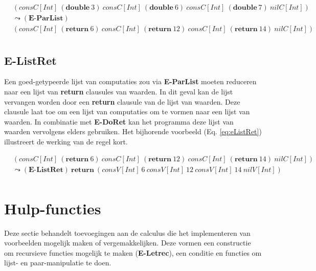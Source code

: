 \begin{equation}
\label{eq:eParList}
    \begin{split}
        & (consC[Int] \ (\textbf{double} \ 3) \ consC[Int] \ (\textbf{double} \ 6) \ consC[Int] \ (\textbf{double} \ 7) \ nilC[Int]) \\
        & \leadsto (\textbf{E-ParList}) \\
        & (consC[Int] \ (\textbf{return} \ 6) \ consC[Int] \ (\textbf{return} \ 12) \ consC[Int] \ (\textbf{return} \ 14) \ nilC[Int]) \\
    \end{split}
\end{equation}

\subsection{E-ListRet}
Een goed-getypeerde lijst van computaties zou via \textbf{E-ParList} moeten reduceren naar een lijst van \textbf{return} clausules van waarden. In dit geval kan de lijst vervangen worden door een \textbf{return} clausule van de lijst van waarden. Deze clausule laat toe om een lijst van computaties om te vormen naar een lijst van waarden. In combinatie met \textbf{E-DoRet} kan het programma deze lijst van waarden vervolgens elders gebruiken.\newline
Het bijhorende voorbeeld (Eq. \ref{eq:eListRet}) illustreert de werking van de regel kort.

\begin{equation}
\label{eq:eListRet}
    \begin{split}
        & (consC[Int] \ (\textbf{return} \ 6) \ consC[Int] \ (\textbf{return} \ 12) \ consC[Int] \ (\textbf{return} \ 14) \ nilC[Int]) \\ 
        & \leadsto (\textbf{E-ListRet}) \ \textbf{return} \ (consV[Int] \ 6 \ consV[Int] \ 12 \ consV[Int] \ 14 \ nilV[Int]) \\
    \end{split}
\end{equation}

\section{Hulp-functies}
Deze sectie behandelt toevoegingen aan de calculus die het implementeren van voorbeelden mogelijk maken of vergemakkelijken. Deze vormen een constructie om recursieve functies mogelijk te maken (\textbf{E-Letrec}), een conditie en functies om lijst- en paar-manipulatie te doen.

